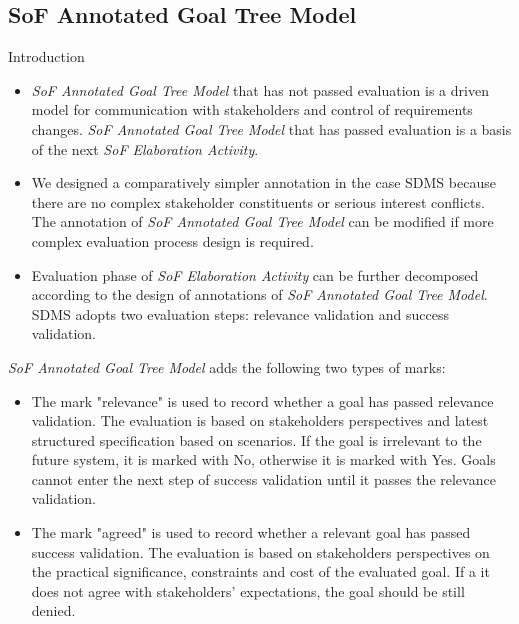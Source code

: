 ﻿\documentclass{beamer}
\begin{document}
\subsection{SoF Annotated Goal Tree Model}
\begin{frame} {Introduction}    %
  \footnotesize{
    \begin{itemize}
    \item \emph{SoF Annotated Goal Tree Model} that has not passed evaluation is a driven model for communication with stakeholders and control of requirements changes. \emph{SoF Annotated Goal Tree Model} that has passed evaluation is a basis of the next \emph{SoF Elaboration Activity}.\pause
    \item We designed a comparatively simpler annotation in the case SDMS because there are no complex stakeholder constituents or serious interest conflicts. The annotation of \emph{SoF Annotated Goal Tree Model} can be modified if more complex evaluation process design is required.\pause
    \item Evaluation phase of \emph{SoF Elaboration Activity} can be further decomposed according to the design of annotations of \emph{SoF Annotated Goal Tree Model}. SDMS adopts two evaluation steps: relevance validation and success validation. \pause
    \end{itemize}
  }
\end{frame}

\begin{frame}{\emph{SoF Annotated Goal Tree Model} adds the following two types of marks:}            %
  \small{
  \begin{itemize}
  \item
    The mark "relevance" is used to record whether a goal has passed relevance validation.
    The evaluation is based on stakeholders perspectives and latest structured specification based on scenarios.
    If the goal is irrelevant to the future system, it is marked with No, otherwise it is marked with Yes.
    Goals cannot enter the next step of success validation until it passes the relevance validation.\pause
  \item
    The mark "agreed" is used to record whether a relevant goal has passed success validation.
    The evaluation is based on stakeholders perspectives on the practical significance, constraints and cost of the evaluated goal. If a it does not agree with stakeholders' expectations, the goal should be still denied.\pause
  \end{itemize}
  }
\end{frame}
\end{document}
